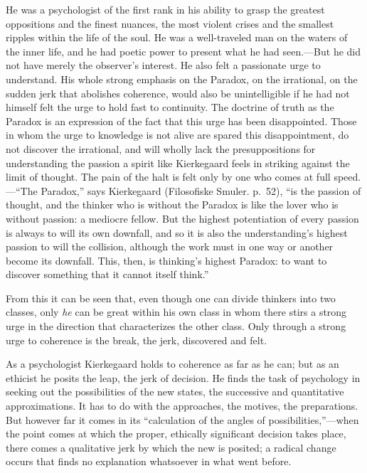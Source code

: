 \documentclass[12pt,a4paper]{book}
\newcommand{\opage}[1]{\marginnote{\footnotesize\textit{[#1]}}}
\begin{document}
He was a psychologist of the first rank in his ability to grasp the
greatest oppositions and the finest nuances, the most violent crises and
the smallest ripples within the life of the soul. He was a well-traveled
man on the waters of the inner life, and he had poetic power to present
what he had seen.---But he did not have merely the observer's interest.
He also felt a passionate urge to understand. His whole strong emphasis
on the Paradox, on the irrational, on the sudden jerk that abolishes
coherence, would also be unintelligible if he had not himself felt the
urge to hold fast to continuity. The doctrine of truth as the Paradox is
an expression of the fact that this urge has been disappointed. Those in
whom the urge to knowledge is not alive are spared this disappointment,
do not discover the irrational, and will wholly lack the presuppositions
for understanding the passion a spirit like Kierkegaard feels in striking
against
\opage{74}the limit of thought. The pain of the halt is felt only by one who comes
at full speed.---``The Paradox,'' says Kierkegaard (Filosofiske Smuler.
p.~52), ``is the passion of thought, and the thinker who is without the
Paradox is like the lover who is without passion: a mediocre fellow. But
the highest potentiation of every passion is always to will its own
downfall, and so it is also the understanding's highest passion to will
the collision, although the work must in one way or another become its
downfall. This, then, is thinking's highest Paradox: to want to discover
something that it cannot itself think.''

From this it can be seen that, even though one can divide thinkers into
two classes, only \textit{he} can be great within his own class in whom
there stirs a strong urge in the direction that characterizes the other
class. Only through a strong urge to coherence is the break, the jerk,
discovered and felt.

As a psychologist Kierkegaard holds to coherence as far as he can; but as
an ethicist he posits the leap, the jerk of decision. He finds the task
of psychology in seeking out the possibilities of the new states, the
successive and quantitative approximations. It has to do with the
approaches, the motives, the preparations. But however far it comes in
its ``calculation of the angles of possibilities,''---when the point
comes at which the proper, ethically significant decision takes place,
there comes a qualitative jerk by which the new is posited; a radical
change occurs that finds no explanation whatsoever in what went before.
\end{document}
